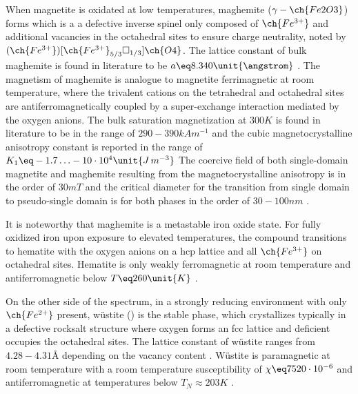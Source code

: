 \documentclass[\main/dresen_thesis.tex]{subfiles}
\begin{document}
  When magnetite is oxidated at low temperatures, maghemite ($\gamma-\ch{Fe2O3}$) forms which is a a defective inverse spinel only composed of $\ch{Fe^{3+}}$ and additional vacancies in the octahedral sites to ensure charge neutrality, noted by $(\ch{Fe^{3+}})[\ch{Fe^{3+}}_{5/3}\square_{1/3}]\ch{O4}$.
  The lattice constant of bulk maghemite is found in literature to be $a \eq 8.340 \unit{\angstrom}$ \cite{Cornell_2003_Their}.
  The magnetism of maghemite is analogue to magnetite ferrimagnetic at room temperature, where the trivalent cations on the tetrahedral and octahedral sites are antiferromagnetically coupled by a super-exchange interaction mediated by the oxygen anions.
  The bulk saturation magnetization at $300 \unit{K}$ is found in literature to be in the range of $290 - 390 \unit{kA m^{-1}}$ and the cubic magnetocrystalline anisotropy constant is reported in the range of $K_1 \eq -1.7 \ldots -10 \cdot 10^{4} \unit{J \, m^{-3}}$ \cite{Cornell_2003_Their}
  The coercive field of both single-domain magnetite and maghemite resulting from the magnetocrystalline anisotropy is in the order of $30 \unit{mT}$ and the critical diameter for the transition from single domain to pseudo-single domain is for both phases in the order of $30 - 100 \unit{nm}$ \cite{Cornell_2003_Their}.

  It is noteworthy that maghemite is a metastable iron oxide state.
  For fully oxidized iron upon exposure to elevated temperatures, the compound transitions to hematite with the oxygen anions on a hcp lattice and all $\ch{Fe^{3+}}$ on octahedral sites.
  Hematite is only weakly ferromagnetic at room temperature and antiferromagnetic below $T \eq 260 \unit{K}$ \cite{Cornell_2003_Their}.

  On the other side of the spectrum, in a strongly reducing environment with only $\ch{Fe^{2+}}$ present, w\"ustite () is the stable phase, which crystallizes typically in a defective rocksalt structure where oxygen forms an fcc lattice and deficient  occupies the octahedral sites.
  The lattice constant of w\"ustite ranges from $4.28 - 4.31 \unit{\angstrom}$ depending on the vacancy content \cite{Cornell_2003_Their}.
  W\"ustite is paramagnetic at room temperature with a room temperature susceptibility of $\chi \eq 7520 \cdot 10^{-6}$ \cite{Lide_2004_Handb} and antiferromagnetic at temperatures below $T_N \approx 203 K$ \cite{Cornell_2003_Their}.
\end{document}
